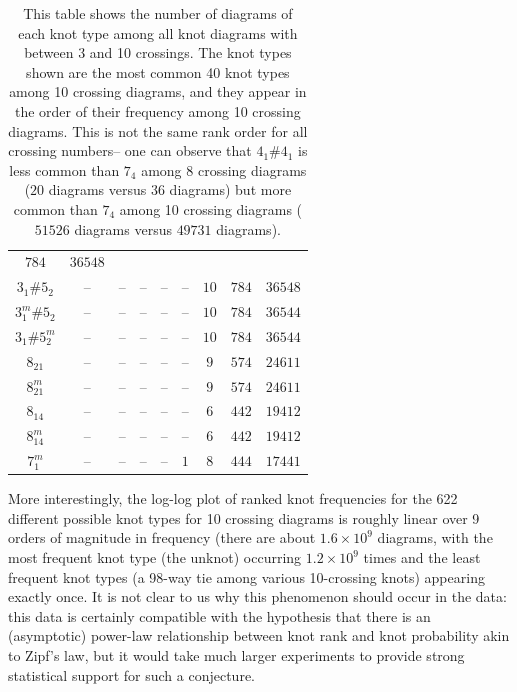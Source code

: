 \documentclass[amsmath,secnumarabic,floatfix,amssymb,nofootinbib,nobibnotes,letterpaper,11pt,tightenlines,showkeys]{revtex4}
\theoremstyle{definition}
\let\mgp=\marginpar \marginparwidth18mm \marginparsep1mm
\def\marginpar#1{\mgp{\raggedright\tiny #1}}
\let\lbl=\label
\def\label#1{\lbl{#1}\ifinner\else\marginpar{\ref{#1} #1}\ignorespaces\fi}
\begin{document}
\begin{table}[tp]
\begin{ruledtabular}
\begin{tabular}{ccccccccc}
$\num{784}$ & 
$\num{36548}$\\ 
$3_{1}^{}\#5_{2}^{}$ & 
-- & 
-- & 
-- & 
-- & 
-- & 
$\num{10}$ & 
$\num{784}$ & 
$\num{36548}$\\ 
$3_{1}^{m}\#5_{2}^{}$ & 
-- & 
-- & 
-- & 
-- & 
-- & 
$\num{10}$ & 
$\num{784}$ & 
$\num{36544}$\\ 
$3_{1}^{}\#5_{2}^{m}$ & 
-- & 
-- & 
-- & 
-- & 
-- & 
$\num{10}$ & 
$\num{784}$ & 
$\num{36544}$\\ 
$8_{21}^{}$ & 
-- & 
-- & 
-- & 
-- & 
-- & 
$\num{9}$ & 
$\num{574}$ & 
$\num{24611}$\\ 
$8_{21}^{m}$ & 
-- & 
-- & 
-- & 
-- & 
-- & 
$\num{9}$ & 
$\num{574}$ & 
$\num{24611}$\\ 
$8_{14}^{}$ & 
-- & 
-- & 
-- & 
-- & 
-- & 
$\num{6}$ & 
$\num{442}$ & 
$\num{19412}$\\ 
$8_{14}^{m}$ & 
-- & 
-- & 
-- & 
-- & 
-- & 
$\num{6}$ & 
$\num{442}$ & 
$\num{19412}$\\ 
$7_{1}^{m}$ & 
-- & 
-- & 
-- & 
-- & 
$\num{1}$ & 
$\num{8}$ & 
$\num{444}$ & 
$\num{17441}$
\end{tabular}
\end{ruledtabular}
\caption{This table shows the number of diagrams of each knot type among all knot diagrams with between 3 and 10 crossings. The knot types shown are the most common 40 knot types among 10 crossing diagrams, and they appear in the order of their frequency among 10 crossing diagrams. This is not the same rank order for all crossing numbers-- one can observe that $4_1 \# 4_1$ is less common than $7_4$ among 8 crossing diagrams ($\num{20}$ diagrams versus $\num{36}$ diagrams) but more common than $7_4$ among 10 crossing diagrams ($\num{51526}$ diagrams versus $\num{49731}$ diagrams).}
\label{tab:knot frequency raw data}
\end{table}


More interestingly, the log-log plot of ranked knot frequencies for the 622 different possible knot types for 10 crossing diagrams is roughly linear over 9 orders of magnitude in frequency (there are about $1.6 \times 10^9$ diagrams, with the most frequent knot type (the unknot) occurring $1.2 \times 10^9$ times and the least frequent knot types (a 98-way tie among various 10-crossing knots) appearing exactly once. It is not clear to us why this phenomenon should occur in the data: this data is certainly compatible with the hypothesis that there is an (asymptotic) power-law relationship between knot rank and knot probability akin to Zipf's law, but it would take much larger experiments to provide strong statistical support for such a conjecture.
\end{document}
